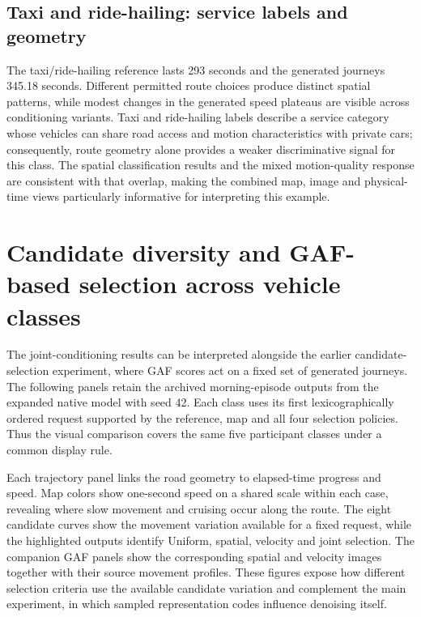 \subsection{Taxi and ride-hailing: service labels and geometry}
The taxi/ride-hailing reference lasts 293 seconds and the generated journeys 345.18 seconds. Different permitted route choices produce distinct spatial patterns, while modest changes in the generated speed plateaus are visible across conditioning variants. Taxi and ride-hailing labels describe a service category whose vehicles can share road access and motion characteristics with private cars; consequently, route geometry alone provides a weaker discriminative signal for this class. The spatial classification results and the mixed motion-quality response are consistent with that overlap, making the combined map, image and physical-time views particularly informative for interpreting this example.
\FloatBarrier
\FloatBarrier
\section{Candidate diversity and GAF-based selection across vehicle classes}
\label{sec:selection-visual-comparison}
The joint-conditioning results can be interpreted alongside the earlier candidate-selection experiment, where GAF scores act on a fixed set of generated journeys. The following panels retain the archived morning-episode outputs from the expanded native model with seed 42. Each class uses its first lexicographically ordered request supported by the reference, map and all four selection policies. Thus the visual comparison covers the same five participant classes under a common display rule.

Each trajectory panel links the road geometry to elapsed-time progress and speed. Map colors show one-second speed on a shared scale within each case, revealing where slow movement and cruising occur along the route. The eight candidate curves show the movement variation available for a fixed request, while the highlighted outputs identify Uniform, spatial, velocity and joint selection. The companion GAF panels show the corresponding spatial and velocity images together with their source movement profiles. These figures expose how different selection criteria use the available candidate variation and complement the main experiment, in which sampled representation codes influence denoising itself.


